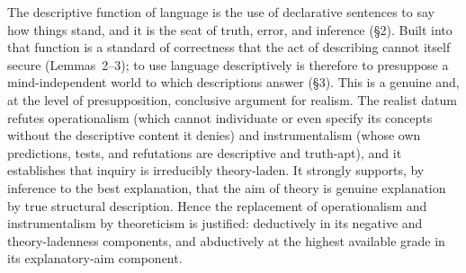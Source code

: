 \documentclass[12pt]{article}
\begin{document}
The descriptive function of language is the use of declarative sentences
to say how things stand, and it is the seat of truth, error, and
inference (\S2). Built into that function is a standard of correctness
that the act of describing cannot itself secure (Lemmas~2--3); to use
language descriptively is therefore to presuppose a mind-independent
world to which descriptions answer (\S3). This is a genuine and, at the
level of presupposition, conclusive argument for realism. The realist
datum refutes operationalism (which cannot individuate or even specify its
concepts without the descriptive content it denies) and instrumentalism
(whose own predictions, tests, and refutations are descriptive and
truth-apt), and it establishes that inquiry is irreducibly theory-laden.
It strongly supports, by inference to the best explanation, that the aim
of theory is genuine explanation by true structural description. Hence the
replacement of operationalism and instrumentalism by theoreticism is
justified: deductively in its negative and theory-ladenness components,
and abductively at the highest available grade in its explanatory-aim
component.
\end{document}
